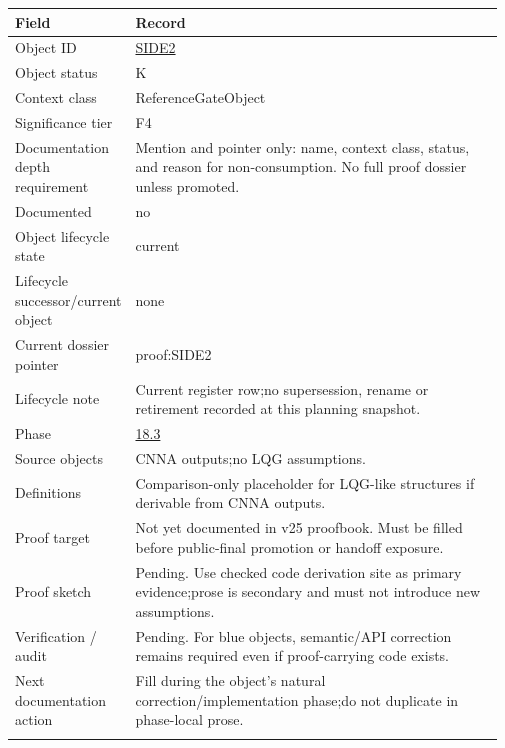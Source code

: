 \begin{longtable}{L{0.16\linewidth} L{0.81\linewidth}}
\hline
\textbf{Field} & \textbf{Record}\\
\hline
Object ID & \hyperlink{object-row-SIDE2}{SIDE2}\\
\hline\addlinespace[0.20em]
Object status & K\\
\hline\addlinespace[0.20em]
Context class & ReferenceGateObject\\
\hline\addlinespace[0.20em]
Significance tier & F4\\
\hline\addlinespace[0.20em]
Documentation depth requirement & Mention and pointer only: name, context class, status, and reason for non-consumption. No full proof dossier unless promoted.\\
\hline\addlinespace[0.20em]
Documented & no\\
\hline\addlinespace[0.20em]
Object lifecycle state & current\\
\hline\addlinespace[0.20em]
Lifecycle successor/\allowbreak{}current object & none\\
\hline\addlinespace[0.20em]
Current dossier pointer & proof:SIDE2\\
\hline\addlinespace[0.20em]
Lifecycle note & Current register row;\newline no supersession, rename or retirement recorded at this planning snapshot.\\
\hline\addlinespace[0.20em]
Phase & \hyperlink{phase-row-18-3}{18.3}\\
\hline\addlinespace[0.20em]
Source objects & CNNA outputs;\newline no LQG assumptions.\\
\hline\addlinespace[0.20em]
Definitions & Comparison-only placeholder for LQG-like structures if derivable from CNNA outputs.\\
\hline\addlinespace[0.20em]
Proof target & Not yet documented in v25 proofbook. Must be filled before public-final promotion or handoff exposure.\\
\hline\addlinespace[0.20em]
Proof sketch & Pending. Use checked code derivation site as primary evidence;\newline prose is secondary and must not introduce new assumptions.\\
\hline\addlinespace[0.20em]
Verification /\allowbreak{} audit & Pending. For blue objects, semantic/\allowbreak{}API correction remains required even if proof-carrying code exists.\\
\hline\addlinespace[0.20em]
Next documentation action & Fill during the object's natural correction/\allowbreak{}implementation phase;\newline do not duplicate in phase-local prose.\\
\hline\addlinespace[0.20em]
\end{longtable}
